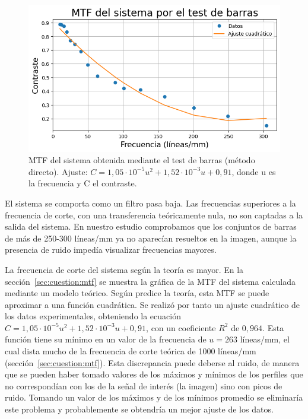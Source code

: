 \documentclass{./packages/optica-article}
\begin{document}
\begin{figure}
    \centering
    \includegraphics[scale=0.5]{MTF-directo.png}
    \caption{MTF del sistema obtenida mediante el test de barras (método directo). Ajuste: $C = 1,05 \cdot 10^{-5} u^2 + 1,52 \cdot 10^{-3} u + 0,91$, donde u es la frecuencia y C el contraste.}
    \label{fig:mtf-directo}
\end{figure}

El sistema se comporta como un filtro pasa baja. Las frecuencias superiores a la frecuencia de corte, con una transferencia teóricamente nula, no son captadas a la salida del sistema. En nuestro estudio comprobamos que los conjuntos de barras de más de 250-300 líneas/mm ya no aparecían resueltos en la imagen, aunque la presencia de ruido impedía visualizar frecuencias mayores.

La frecuencia de corte del sistema según la teoría es mayor. En la sección~\ref{sec:cuestion:mtf} se muestra la gráfica de la MTF del sistema calculada mediante un modelo teórico. Según predice la teoría, esta MTF se puede aproximar a una función cuadrática. Se realizó por tanto un ajuste cuadrático de los datos experimentales, obteniendo la ecuación $C = 1,05 \cdot 10^{-5} u^2 + 1,52 \cdot 10^{-3} u + 0,91$, con un coeficiente $R^2$ de $0,964$. Esta función tiene su mínimo en un valor de la frecuencia de $u = 263$ líneas/mm, el cual dista mucho de la frecuencia de corte teórica de 1000 líneas/mm (sección~\ref{sec:cuestion:mtf}). Esta discrepancia puede deberse al ruido, de manera que se pueden haber tomado valores de los máximos y mínimos de los perfiles que no correspondían con los de la señal de interés (la imagen) sino con picos de ruido. Tomando un valor de los máximos y de los mínimos promedio se eliminaría este problema y probablemente se obtendría un mejor ajuste de los datos.
\end{document}
